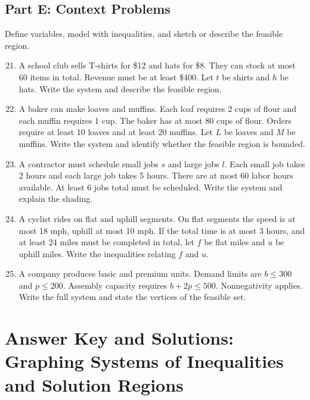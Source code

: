 \documentclass[14pt]{extarticle}
\begin{document}
\subsection*{Part E: Context Problems}
Define variables, model with inequalities, and sketch or describe the feasible region.
\begin{enumerate}
  \setcounter{enumi}{20}
  \item A school club sells T-shirts for \$12 and hats for \$8. They can stock at most 60 items in total. Revenue must be at least \$400. Let \(t\) be shirts and \(h\) be hats. Write the system and describe the feasible region.
  \item A baker can make loaves and muffins. Each loaf requires 2 cups of flour and each muffin requires 1 cup. The baker has at most 80 cups of flour. Orders require at least 10 loaves and at least 20 muffins. Let \(L\) be loaves and \(M\) be muffins. Write the system and identify whether the feasible region is bounded.
  \item A contractor must schedule small jobs \(s\) and large jobs \(l\). Each small job takes 2 hours and each large job takes 5 hours. There are at most 60 labor hours available. At least 6 jobs total must be scheduled. Write the system and explain the shading.
  \item A cyclist rides on flat and uphill segments. On flat segments the speed is at most 18 mph, uphill at most 10 mph. If the total time is at most 3 hours, and at least 24 miles must be completed in total, let \(f\) be flat miles and \(u\) be uphill miles. Write the inequalities relating \(f\) and \(u\).
  \item A company produces basic and premium units. Demand limits are \(b \le 300\) and \(p \le 200\). Assembly capacity requires \(b + 2p \le 500\). Nonnegativity applies. Write the full system and state the vertices of the feasible set.
\end{enumerate}

\newpage


\section*{Answer Key and Solutions: Graphing Systems of Inequalities and Solution Regions}
\end{document}
